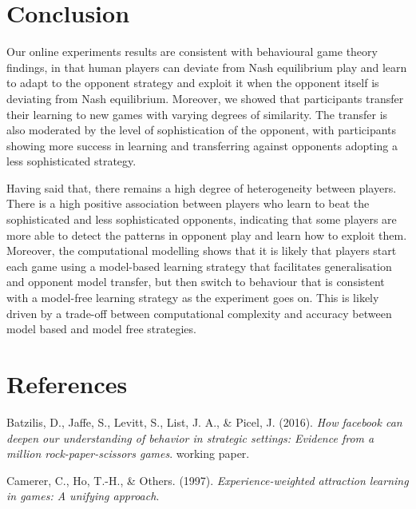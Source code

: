 \documentclass[man,floatsintext]{apa6}
\begin{document}
\hypertarget{conclusion}{%
\section{Conclusion}\label{conclusion}}

Our online experiments results are consistent with behavioural game theory findings, in that human players can deviate from Nash equilibrium play and learn to adapt to the opponent strategy and exploit it when the opponent itself is deviating from Nash equilibrium. Moreover, we showed that participants transfer their learning to new games with varying degrees of similarity. The transfer is also moderated by the level of sophistication of the opponent, with participants showing more success in learning and transferring against opponents adopting a less sophisticated strategy.

Having said that, there remains a high degree of heterogeneity between players. There is a high positive association between players who learn to beat the sophisticated and less sophisticated opponents, indicating that some players are more able to detect the patterns in opponent play and learn how to exploit them. Moreover, the computational modelling shows that it is likely that players start each game using a model-based learning strategy that facilitates generalisation and opponent model transfer, but then switch to behaviour that is consistent with a model-free learning strategy as the experiment goes on. This is likely driven by a trade-off between computational complexity and accuracy between model based and model free strategies.
\newpage

\hypertarget{references}{%
\section{References}\label{references}}

\begingroup
\setlength{\parindent}{-0.5in}
\setlength{\leftskip}{0.5in}

\hypertarget{refs}{}
\leavevmode\hypertarget{ref-batzilis}{}%
Batzilis, D., Jaffe, S., Levitt, S., List, J. A., \& Picel, J. (2016). \emph{How facebook can deepen our understanding of behavior in strategic settings: Evidence from a million rock-paper-scissors games}. working paper.

\leavevmode\hypertarget{ref-camerer1997experience}{}%
Camerer, C., Ho, T.-H., \& Others. (1997). \emph{Experience-weighted attraction learning in games: A unifying approach}.
\end{document}
